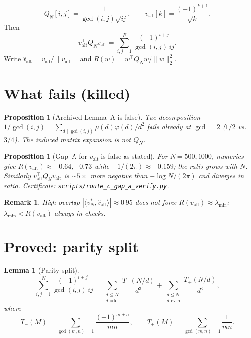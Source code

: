 \documentclass[11pt]{article}
\newtheorem{lemma}[theorem]{Lemma}
\newtheorem{proposition}[theorem]{Proposition}
\newtheorem{remark}[theorem]{Remark}
\begin{document}
\[
Q_N[i,j]=\frac{1}{\gcd(i,j)\sqrt{ij}},\qquad
v_{\mathrm{alt}}[k]=\frac{(-1)^{k+1}}{\sqrt{k}}.
\]
Then
\[
v_{\mathrm{alt}}^\top Q_N v_{\mathrm{alt}}
=\sum_{i,j=1}^N\frac{(-1)^{i+j}}{\gcd(i,j)\,ij}.
\]
Write $\hat v_{\mathrm{alt}}=v_{\mathrm{alt}}/\|v_{\mathrm{alt}}\|$ and
$R(w)=w^\top Q_N w/\|w\|_2^2$.

\section{What fails (killed)}

\begin{proposition}[Archived Lemma~A is false]\label{prop:lemmaAfalse}
The decomposition
$1/\gcd(i,j)=\sum_{d\mid\gcd(i,j)}\mu(d)\varphi(d)/d^2$
fails already at $\gcd=2$ ($1/2$ vs.\ $3/4$).
The induced matrix expansion is not $Q_N$.
\end{proposition}

\begin{proposition}[Gap~A for $v_{\mathrm{alt}}$ is false as stated]\label{prop:valtfalse}
For $N=500,1000$, numerics give $R(v_{\mathrm{alt}})\approx -0.64,-0.73$
while $-1/(2\pi)\approx -0.159$; the ratio grows with $N$.
Similarly $v_{\mathrm{alt}}^\top Q_N v_{\mathrm{alt}}$ is $\sim 5\times$
more negative than $-\log N/(2\pi)$ and diverges in ratio.
Certificate: \texttt{scripts/route\_c\_gap\_a\_verify.py}.
\end{proposition}

\begin{remark}
High overlap $|\langle v_N^*,\hat v_{\mathrm{alt}}\rangle|\approx 0.95$
does \emph{not} force $R(v_{\mathrm{alt}})\approx\lambda_{\min}$:
$\lambda_{\min}<R(v_{\mathrm{alt}})$ always in checks.
\end{remark}

\section{Proved: parity split}

\begin{lemma}[Parity split]\label{lem:parity}
\[
\sum_{i,j=1}^N\frac{(-1)^{i+j}}{\gcd(i,j)\,ij}
=\sum_{\substack{d\le N\\ d\text{ odd}}}\frac{T_-(N/d)}{d^3}
+\sum_{\substack{d\le N\\ d\text{ even}}}\frac{T_+(N/d)}{d^3},
\]
where
\[
T_-(M)=\sum_{\gcd(m,n)=1}\frac{(-1)^{m+n}}{mn},\qquad
T_+(M)=\sum_{\gcd(m,n)=1}\frac1{mn}.
\]
\end{lemma}
\end{document}
